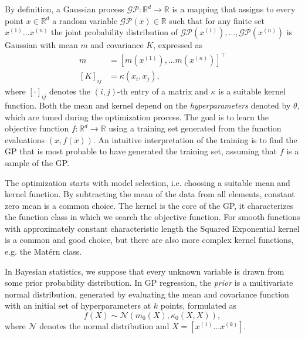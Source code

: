 By definition, a Gaussian process $\mathcal{GP}: \mathbb{R}^{d} \rightarrow \mathbb{R}$ is a mapping that assigns to every point $x \in \mathbb{R}^{d}$ a random variable $\mathcal{G} \mathcal{P}(x) \in \mathbb{R}$ such that for any finite set $x^{(1)} \ldots x^{(n)}$ the joint probability distribution of $\mathcal{G} \mathcal{P}\left(x^{(1)}\right), \ldots, \mathcal{G} \mathcal{P}\left(x^{(n)}\right)$ is Gaussian with mean $m$ and covariance $K$, expressed as
\begin{subequations}
\begin{align}
m &=\left[m\left(x^{(1)}\right), \ldots m\left(x^{(n)}\right)\right]^{\top} \\
[K]_{i j} &=\kappa\left(x_{i}, x_{j}\right),
\end{align}
\end{subequations}
where $[\cdot]_{i j}$ denotes the $(i, j)$-th entry of a matrix and $\kappa$ is a suitable kernel function. Both the mean and kernel depend on the \textit{hyperparameters} denoted by $\theta$, which are tuned during the optimization process. The goal is to learn the objective function $f:\mathbb{R}^d \rightarrow \mathbb{R}$ using a training set generated from the function evaluations $(x, f(x))$. An intuitive interpretation of the training is to find the GP that is most probable to have generated the training set, assuming that $f$ is a sample of the GP. 

The optimization starts with model selection, i.e. choosing a suitable mean and kernel function. By subtracting the mean of the data from all elements, constant zero mean is a common choice. The kernel is the core of the GP, it characterizes the function class in which we search the objective function. For smooth functions with approximately constant characteristic length the Squared Exponential kernel is a common and good choice, but there are also more complex kernel functions, e.g. the Matérn class.

In Bayesian statistics, we suppose that every unknown variable is drawn from some prior probability distribution. In GP regression, the \textit{prior} is a multivariate normal distribution, generated by evaluating the mean and covariance function with an initial set of hyperparameters at $k$ points, formulated as
\begin{equation}\label{eq:prior}
    f(X) \sim \mathcal{N}(m_0(X),\kappa_0(X,X)),
\end{equation}
where $\mathcal{N}$ denotes the normal distribution and $X=[x^{(1)}\dots x^{(k)}]$.

